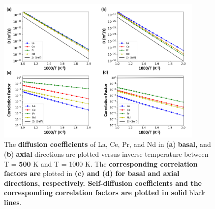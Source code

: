 \documentclass[preprint,12pt]{elsarticle}
\providecommand{\DIFadd}[1]{{\bf #1}} %
\providecommand{\DIFdel}[1]{} %
\providecommand{\DIFdelbegin}{\protect\color{red}} %
\providecommand{\DIFdelend}{\protect\color{black}} %
\providecommand{\DIFaddFL}[1]{\DIFadd{#1}} %
\providecommand{\DIFdelFL}[1]{\DIFdel{#1}} %
\providecommand{\DIFaddbeginFL}{} %
\providecommand{\DIFaddendFL}{} %
\providecommand{\DIFdelbeginFL}{} %
\providecommand{\DIFdelendFL}{} %
\newcommand{\DIFscaledelfig}{0.5}
\newlength{\DIFdelgraphicswidth} %
\newlength{\DIFdelgraphicsheight} %
\newcommand{\DIFaddincludegraphics}[2][]{{\color{blue}\fbox{\DIFOincludegraphics[#1]{#2}}}} %
\newcommand{\DIFdelincludegraphics}[2][]{%
\sbox{\DIFdelgraphicsbox}{\DIFOincludegraphics[#1]{#2}}%
\settoboxwidth{\DIFdelgraphicswidth}{\DIFdelgraphicsbox} %
\settoboxtotalheight{\DIFdelgraphicsheight}{\DIFdelgraphicsbox} %
\scalebox{\DIFscaledelfig}{%
\parbox[b]{\DIFdelgraphicswidth}{\usebox{\DIFdelgraphicsbox}\\[-\baselineskip] \rule{\DIFdelgraphicswidth}{0em}}\llap{\resizebox{\DIFdelgraphicswidth}{\DIFdelgraphicsheight}{%
\setlength{\unitlength}{\DIFdelgraphicswidth}%
\begin{picture}(1,1)%
\thicklines\linethickness{2pt} %
{\color[rgb]{1,0,0}\put(0,0){\framebox(1,1){}}}%
{\color[rgb]{1,0,0}\put(0,0){\line( 1,1){1}}}%
{\color[rgb]{1,0,0}\put(0,1){\line(1,-1){1}}}%
\end{picture}%
}\hspace*{3pt}}} %
} %
\DeclareRobustCommand{\DIFdelbegin}{\DIFOdelbegin \let\includegraphics\DIFdelincludegraphics} %
\DeclareRobustCommand{\DIFdelend}{\DIFOaddend \let\includegraphics\DIFOincludegraphics} %
\DeclareRobustCommand{\DIFaddbeginFL}{\DIFOaddbeginFL \let\includegraphics\DIFaddincludegraphics} %
\DeclareRobustCommand{\DIFaddendFL}{\DIFOaddendFL \let\includegraphics\DIFOincludegraphics} %
\DeclareRobustCommand{\DIFdelbeginFL}{\DIFOdelbeginFL \let\includegraphics\DIFdelincludegraphics} %
\DeclareRobustCommand{\DIFdelendFL}{\DIFOaddendFL \let\includegraphics\DIFOincludegraphics} %
\begin{document}
\begin{figure}[h!]
    \DIFaddendFL \centering
    \DIFdelbeginFL %
\DIFdelendFL \DIFaddbeginFL \includegraphics[width=0.9\textwidth]{13_correlation_factors.jpg}
    \DIFaddendFL \caption{The \DIFdelbeginFL \DIFdelFL{diffusivity }\DIFdelendFL \DIFaddbeginFL \DIFaddFL{diffusion coefficients }\DIFaddendFL of La, Ce, Pr, and Nd in \DIFdelbeginFL \DIFdelFL{both basal }\DIFdelendFL (\DIFdelbeginFL \DIFdelFL{dashed lines}\DIFdelendFL \DIFaddbeginFL \DIFaddFL{a}\DIFaddendFL ) \DIFaddbeginFL \DIFaddFL{basal, }\DIFaddendFL and \DIFdelbeginFL \DIFdelFL{axial }\DIFdelendFL (\DIFdelbeginFL \DIFdelFL{solid lines}\DIFdelendFL \DIFaddbeginFL \DIFaddFL{b}\DIFaddendFL ) \DIFaddbeginFL \DIFaddFL{axial }\DIFaddendFL directions are plotted versus inverse temperature between T = \DIFdelbeginFL \DIFdelFL{800 }\DIFdelendFL \DIFaddbeginFL \DIFaddFL{500 }\DIFaddendFL K and T = 1000 K. The \DIFdelbeginFL \DIFdelFL{self-diffusivity of Zr is }\DIFdelendFL \DIFaddbeginFL \DIFaddFL{corresponding correlation factors are }\DIFaddendFL plotted in \DIFaddbeginFL \DIFaddFL{(c) and (d) for basal and axial directions, respectively. Self-diffusion coefficients and the corresponding correlation factors are plotted in solid }\DIFaddendFL black \DIFaddbeginFL \DIFaddFL{lines}\DIFaddendFL .}
    \DIFdelbeginFL %
\DIFdelendFL \DIFaddbeginFL \label{fig:correlation_factors}
\DIFaddendFL \end{figure}

\FloatBarrier
 \DIFdelbegin %

\DIFdelend  

\end{document}
